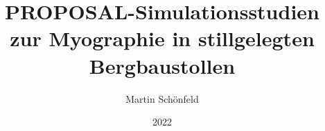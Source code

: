 \documentclass[
  tucolor,       %
  BCOR=12mm,     %
  parskip=half,  %
  open=any,      %
  cleardoublepage=plain,  %
]{tudothesis}
\author{Martin Schönfeld}
\title{PROPOSAL-Simulationsstudien zur Myographie in stillgelegten Bergbaustollen}
\date{2022}
\begin{document}
\frontmatter
% 
\maketitle 
 
\makecorrectorpage

% 
\tableofcontents

\mainmatter








% 

\appendix


\backmatter
\printbibliography

\end{document}
